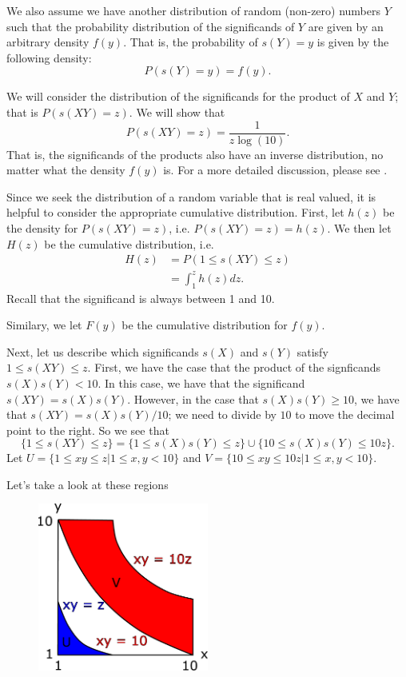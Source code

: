 We also assume we have another distribution of random (non-zero) numbers \(Y\) such that the probability distribution of the significands of \(Y\) are given by an 
arbitrary density \(f(y)\). That is, the probability of \(s(Y) = y\) is given by the following density:
\begin{equation}
P\left(s(Y) = y\right) = f(y).
\end{equation}

We will consider the distribution of the significands for the product of \(X\) and \(Y\); that is \(P(s(XY) = z)\). We will show that
\begin{equation}
P(s(XY) = z) = \frac{1}{z\log(10)}.
\end{equation}
That is, the significands of the products also have an inverse distribution, no matter what the density \(f(y)\) is. For a more detailed discussion, please see \cite{Hamming}.

Since we seek the distribution of a random variable that is real valued, it is helpful to consider the appropriate cumulative distribution. First, let \(h(z)\) be the density
for \(P(s(XY) = z)\), i.e. \(P(s(XY) = z) = h(z)\). We then let \(H(z)\) be the cumulative distribution, i.e.
\begin{align}
H(z) & = P(1 \leq s(XY) \leq z) \\
    & = \int_1^z h(z) dz.
\end{align}
Recall that the significand is always between 1 and 10.

Similary, we let \(F(y)\) be the cumulative distribution for \(f(y)\).

Next, let us describe which significands \(s(X)\) and \(s(Y)\) satisfy \(1 \leq s(XY) \leq z\). First, we have the case that the product of the signficands \(s(X)s(Y) < 10\). In this case, we have that
the significand \(s(XY) = s(X)s(Y)\). However, in the case that \(s(X)s(Y) \geq 10\), we have that \(s(XY) = s(X)s(Y) / 10\); we need to divide by \(10\) to move the decimal point to the right. So we
see that
\begin{equation}
\{1 \leq s(XY) \leq z\} = \{1 \leq s(X)s(Y) \leq z\} \cup \{10 \leq s(X)s(Y) \leq 10z\}.
\end{equation}
Let \(U = \{1 \leq xy \leq z | 1\leq x,y < 10\}\) and \(V = \{10 \leq xy \leq 10z | 1\leq x, y < 10\}\).

Let's take a look at these regions

\begin{figure}[h]
\centering
\includegraphics[width = 0.5\textwidth]{multiVarIntCalc/significandProduct.pdf}
\end{figure}

